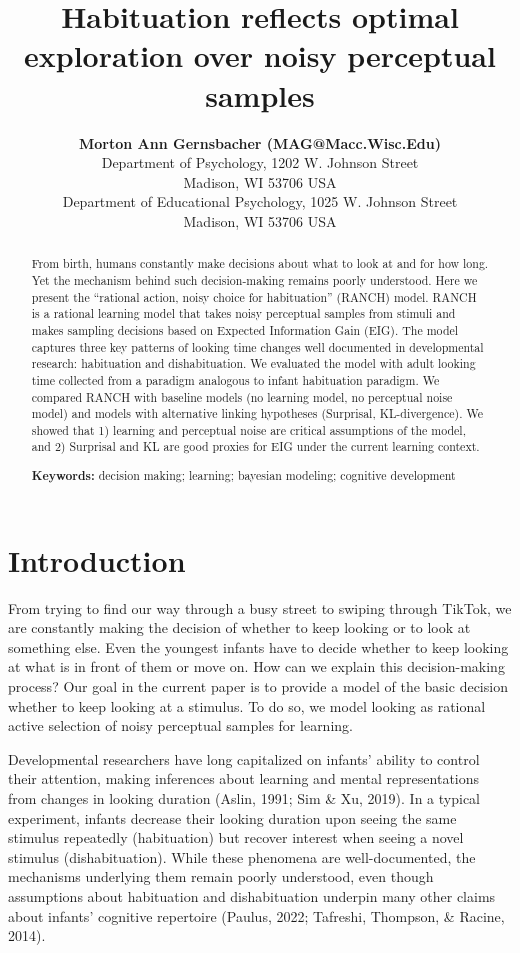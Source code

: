 \documentclass[10pt, letterpaper]{article}
\title{Habituation reflects optimal exploration over noisy perceptual
samples}
\author{{\large \bf Morton Ann Gernsbacher (MAG@Macc.Wisc.Edu)} \\ Department of Psychology, 1202 W. Johnson Street \\ Madison, WI 53706 USA \AND {\large \bf Sharon J.~Derry (SDJ@Macc.Wisc.Edu)} \\ Department of Educational Psychology, 1025 W. Johnson Street \\ Madison, WI 53706 USA}
\begin{document}
\maketitle

\begin{abstract}
From birth, humans constantly make decisions about what to look at and
for how long. Yet the mechanism behind such decision-making remains
poorly understood. Here we present the ``rational action, noisy choice
for habituation'' (RANCH) model. RANCH is a rational learning model that
takes noisy perceptual samples from stimuli and makes sampling decisions
based on Expected Information Gain (EIG). The model captures three key
patterns of looking time changes well documented in developmental
research: habituation and dishabituation. We evaluated the model with
adult looking time collected from a paradigm analogous to infant
habituation paradigm. We compared RANCH with baseline models (no
learning model, no perceptual noise model) and models with alternative
linking hypotheses (Surprisal, KL-divergence). We showed that 1)
learning and perceptual noise are critical assumptions of the model, and
2) Surprisal and KL are good proxies for EIG under the current learning
context.

\textbf{Keywords:}
decision making; learning; bayesian modeling; cognitive development
\end{abstract}

\hypertarget{introduction}{%
\section{Introduction}\label{introduction}}

From trying to find our way through a busy street to swiping through
TikTok, we are constantly making the decision of whether to keep looking
or to look at something else. Even the youngest infants have to decide
whether to keep looking at what is in front of them or move on. How can
we explain this decision-making process? Our goal in the current paper
is to provide a model of the basic decision whether to keep looking at a
stimulus. To do so, we model looking as rational active selection of
noisy perceptual samples for learning.

Developmental researchers have long capitalized on infants' ability to
control their attention, making inferences about learning and mental
representations from changes in looking duration (Aslin, 1991; Sim \&
Xu, 2019). In a typical experiment, infants decrease their looking
duration upon seeing the same stimulus repeatedly (habituation) but
recover interest when seeing a novel stimulus (dishabituation). While
these phenomena are well-documented, the mechanisms underlying them
remain poorly understood, even though assumptions about habituation and
dishabituation underpin many other claims about infants' cognitive
repertoire (Paulus, 2022; Tafreshi, Thompson, \& Racine, 2014).
\end{document}
